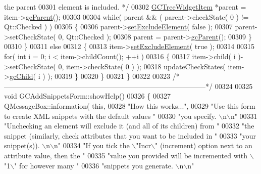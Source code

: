 \begin{DoxyCode}
{{{       the parent}
00301 \textcolor{comment}{      element is included. */}
00302     \hyperlink{class_g_c_tree_widget_item}{GCTreeWidgetItem} *parent = item->\hyperlink{class_g_c_tree_widget_item_a1125dbc55a8ba3e50662b8258cb35fdf}{gcParent}();
00303 
00304     \textcolor{keywordflow}{while}( parent && ( parent->checkState( 0 ) != Qt::Checked ) )
00305     \{
00306       parent->\hyperlink{class_g_c_tree_widget_item_a4c1932884c3e7c0da8be9e2582e02f41}{setExcludeElement}( \textcolor{keyword}{false} );
00307       parent->setCheckState( 0, Qt::Checked );
00308       parent = parent->\hyperlink{class_g_c_tree_widget_item_a1125dbc55a8ba3e50662b8258cb35fdf}{gcParent}();
00309     \}
00310   \}
00311   \textcolor{keywordflow}{else}
00312   \{
00313     item->\hyperlink{class_g_c_tree_widget_item_a4c1932884c3e7c0da8be9e2582e02f41}{setExcludeElement}( \textcolor{keyword}{true} );
00314 
00315     \textcolor{keywordflow}{for}( \textcolor{keywordtype}{int} i = 0; i < item->childCount(); ++i )
00316     \{
00317       item->child( i )->setCheckState( 0, item->checkState( 0 ) );
00318       updateCheckStates( item->\hyperlink{class_g_c_tree_widget_item_af44c0d2c5eaa1c5bb3a6a1aace3e8c78}{gcChild}( i ) );
00319     \}
00320   \}
00321 \}
00322 
00323 \textcolor{comment}{/*
      --------------------------------------------------------------------------------------*/}
00324 
00325 \textcolor{keywordtype}{void} GCAddSnippetsForm::showHelp()
00326 \{
00327   QMessageBox::information( \textcolor{keyword}{this},
00328                             \textcolor{stringliteral}{"How this works..."},
00329                             \textcolor{stringliteral}{"Use this form to create XML snippets with the
       default values "}
00330                             \textcolor{stringliteral}{"you specify. \(\backslash\)n\(\backslash\)n"}
00331                             \textcolor{stringliteral}{"Unchecking an element will exclude it (and all of
       its children) from "}
00332                             \textcolor{stringliteral}{"the snippet (similarly, check attributes that you
       want to be included in "}
00333                             \textcolor{stringliteral}{"your snippet(s)). \(\backslash\)n\(\backslash\)n"}
00334                             \textcolor{stringliteral}{"If you tick the \(\backslash\)"Incr\(\backslash\)" (increment) option next
       to an attribute value, then the "}
00335                             \textcolor{stringliteral}{"value you provided will be incremented with \(\backslash\)"1\(\backslash\)"
       for however many "}
00336                             \textcolor{stringliteral}{"snippets you generate. \(\backslash\)n\(\backslash\)n"}
}}
\end{DoxyCode}
